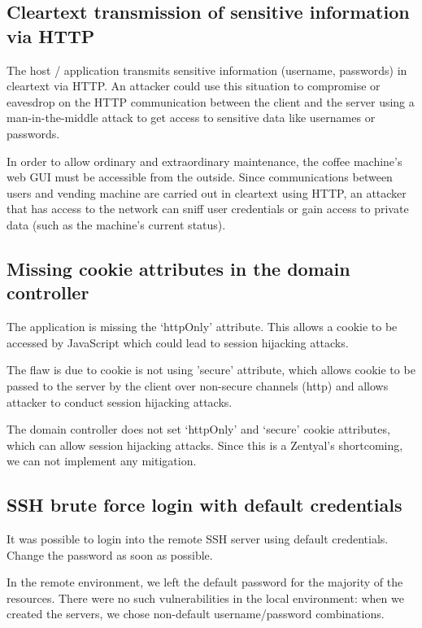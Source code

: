 \documentclass[draft]{homework}
\begin{document}
    \subsection{Cleartext transmission of sensitive information via HTTP}
    \begin{displayquote}
        The host / application transmits sensitive information (username, passwords) in cleartext via HTTP.
        \textelp{}
        An attacker could use this situation to compromise or eavesdrop on the HTTP communication between the client and the server using a man-in-the-middle attack to get access to sensitive data like usernames or passwords.
    \end{displayquote}
    In order to allow ordinary and extraordinary maintenance, the coffee machine's web GUI must be accessible from the outside.
    Since communications between users and vending machine are carried out in cleartext using HTTP, an attacker that has access to the network can sniff user credentials or gain access to private data (such as the machine's current status).
    
    \subsection{Missing cookie attributes in the domain controller}
    \begin{displayquote}
        The application is missing the `httpOnly' attribute.
        \textelp{}
        This allows a cookie to be accessed by JavaScript which could lead to session hijacking attacks.
    \end{displayquote}
    \begin{displayquote}
        The flaw is due to cookie is not using 'secure' attribute, which allows cookie to be passed to the server by the client over non-secure channels (http) and allows attacker to conduct session hijacking attacks.
    \end{displayquote}
    The domain controller does not set `httpOnly' and `secure' cookie attributes, which can allow session hijacking attacks.
    Since this is a Zentyal's shortcoming, we can not implement any mitigation.
    
    \subsection{SSH brute force login with default credentials}
    \begin{displayquote}
        It was possible to login into the remote SSH server using default credentials.
       \textelp{}
       Change the password as soon as possible.
    \end{displayquote}
    In the remote environment, we left the default password for the majority of the resources.
    There were no such vulnerabilities in the local environment: when we created the servers, we chose non-default username/password combinations.
    
\end{document}
